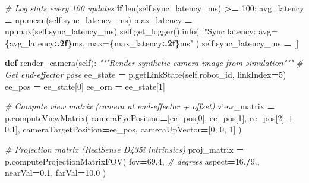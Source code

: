 \documentclass[
]{article}
\newenvironment{Shaded}{\begin{snugshade}}{\end{snugshade}}
\newcommand{\BuiltInTok}[1]{#1}
\newcommand{\CommentTok}[1]{\textcolor[rgb]{0.56,0.35,0.01}{\textit{#1}}}
\newcommand{\ControlFlowTok}[1]{\textcolor[rgb]{0.13,0.29,0.53}{\textbf{#1}}}
\newcommand{\DecValTok}[1]{\textcolor[rgb]{0.00,0.00,0.81}{#1}}
\newcommand{\FloatTok}[1]{\textcolor[rgb]{0.00,0.00,0.81}{#1}}
\newcommand{\KeywordTok}[1]{\textcolor[rgb]{0.13,0.29,0.53}{\textbf{#1}}}
\newcommand{\NormalTok}[1]{#1}
\newcommand{\OperatorTok}[1]{\textcolor[rgb]{0.81,0.36,0.00}{\textbf{#1}}}
\newcommand{\SpecialCharTok}[1]{\textcolor[rgb]{0.81,0.36,0.00}{\textbf{#1}}}
\newcommand{\SpecialStringTok}[1]{\textcolor[rgb]{0.31,0.60,0.02}{#1}}
\newcommand{\VariableTok}[1]{\textcolor[rgb]{0.00,0.00,0.00}{#1}}
\begin{document}
\begin{Shaded}
\begin{Highlighting}[]
        \CommentTok{\# Log stats every 100 updates}
        \ControlFlowTok{if} \BuiltInTok{len}\NormalTok{(}\VariableTok{self}\NormalTok{.sync\_latency\_ms) }\OperatorTok{\textgreater{}=} \DecValTok{100}\NormalTok{:}
\NormalTok{            avg\_latency }\OperatorTok{=}\NormalTok{ np.mean(}\VariableTok{self}\NormalTok{.sync\_latency\_ms)}
\NormalTok{            max\_latency }\OperatorTok{=}\NormalTok{ np.}\BuiltInTok{max}\NormalTok{(}\VariableTok{self}\NormalTok{.sync\_latency\_ms)}
            \VariableTok{self}\NormalTok{.get\_logger().info(}
                \SpecialStringTok{f"Sync latency: avg=}\SpecialCharTok{\{}\NormalTok{avg\_latency}\SpecialCharTok{:.2f\}}\SpecialStringTok{ms, max=}\SpecialCharTok{\{}\NormalTok{max\_latency}\SpecialCharTok{:.2f\}}\SpecialStringTok{ms"}
\NormalTok{            )}
            \VariableTok{self}\NormalTok{.sync\_latency\_ms }\OperatorTok{=}\NormalTok{ []}

    \KeywordTok{def}\NormalTok{ render\_camera(}\VariableTok{self}\NormalTok{):}
        \CommentTok{"""Render synthetic camera image from simulation"""}
        \CommentTok{\# Get end{-}effector pose}
\NormalTok{        ee\_state }\OperatorTok{=}\NormalTok{ p.getLinkState(}\VariableTok{self}\NormalTok{.robot\_id, linkIndex}\OperatorTok{=}\DecValTok{5}\NormalTok{)}
\NormalTok{        ee\_pos }\OperatorTok{=}\NormalTok{ ee\_state[}\DecValTok{0}\NormalTok{]}
\NormalTok{        ee\_orn }\OperatorTok{=}\NormalTok{ ee\_state[}\DecValTok{1}\NormalTok{]}

        \CommentTok{\# Compute view matrix (camera at end{-}effector + offset)}
\NormalTok{        view\_matrix }\OperatorTok{=}\NormalTok{ p.computeViewMatrix(}
\NormalTok{            cameraEyePosition}\OperatorTok{=}\NormalTok{[ee\_pos[}\DecValTok{0}\NormalTok{], ee\_pos[}\DecValTok{1}\NormalTok{], ee\_pos[}\DecValTok{2}\NormalTok{] }\OperatorTok{+} \FloatTok{0.1}\NormalTok{],}
\NormalTok{            cameraTargetPosition}\OperatorTok{=}\NormalTok{ee\_pos,}
\NormalTok{            cameraUpVector}\OperatorTok{=}\NormalTok{[}\DecValTok{0}\NormalTok{, }\DecValTok{0}\NormalTok{, }\DecValTok{1}\NormalTok{]}
\NormalTok{        )}

        \CommentTok{\# Projection matrix (RealSense D435i intrinsics)}
\NormalTok{        proj\_matrix }\OperatorTok{=}\NormalTok{ p.computeProjectionMatrixFOV(}
\NormalTok{            fov}\OperatorTok{=}\FloatTok{69.4}\NormalTok{,  }\CommentTok{\# degrees}
\NormalTok{            aspect}\OperatorTok{=}\FloatTok{16.}\OperatorTok{/}\FloatTok{9.}\NormalTok{,}
\NormalTok{            nearVal}\OperatorTok{=}\FloatTok{0.1}\NormalTok{,}
\NormalTok{            farVal}\OperatorTok{=}\FloatTok{10.0}
\NormalTok{        )}


\end{Highlighting}
\end{Shaded}
\end{document}
